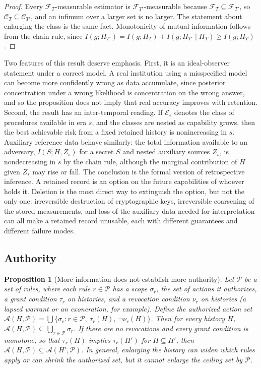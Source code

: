 \documentclass[11pt]{article}
\theoremstyle{plain}
\newtheorem{proposition}{Proposition}
\theoremstyle{definition}
\theoremstyle{remark}
\begin{document}
\begin{proof}
Every $\mathcal{F}_T$-measurable estimator is $\mathcal{F}_{T'}$-measurable because $\mathcal{F}_T\subseteq\mathcal{F}_{T'}$, so $\mathcal{C}_T\subseteq\mathcal{C}_{T'}$, and an infimum over a larger set is no larger. The statement about enlarging the class is the same fact. Monotonicity of mutual information follows from the chain rule, since $I(g;H_{T'})=I(g;H_T)+I(g;H_{T'}\mid H_T)\geq I(g;H_T)$.
\end{proof}

Two features of this result deserve emphasis. First, it is an ideal-observer statement under a correct model. A real institution using a misspecified model can become more confidently wrong as data accumulate, since posterior concentration under a wrong likelihood is concentration on the wrong answer, and so the proposition does not imply that real accuracy improves with retention. Second, the result has an inter-temporal reading. If $\mathcal{E}_s$ denotes the class of procedures available in era $s$, and the classes are nested as capability grows, then the best achievable risk from a fixed retained history is nonincreasing in $s$. Auxiliary reference data behave similarly: the total information available to an adversary, $I(S;H,Z_s)$ for a secret $S$ and nested auxiliary sources $Z_s$, is nondecreasing in $s$ by the chain rule, although the marginal contribution of $H$ given $Z_s$ may rise or fall. The conclusion is the formal version of retrospective inference. A retained record is an option on the future capabilities of whoever holds it. Deletion is the most direct way to extinguish the option, but not the only one: irreversible destruction of cryptographic keys, irreversible coarsening of the stored measurements, and loss of the auxiliary data needed for interpretation can all make a retained record unusable, each with different guarantees and different failure modes.

\subsection{Authority}

\begin{proposition}[More information does not establish more authority]\label{prop:authority}
Let $\mathcal{P}$ be a set of rules, where each rule $r\in\mathcal{P}$ has a scope $\sigma_r$, the set of actions it authorizes, a grant condition $\tau_r$ on histories, and a revocation condition $\nu_r$ on histories (a lapsed warrant or an exoneration, for example). Define the authorized action set $\mathcal{A}(H,\mathcal{P})=\bigcup\{\sigma_r: r\in\mathcal{P},\ \tau_r(H),\ \neg\nu_r(H)\}$. Then for every history $H$, $\mathcal{A}(H,\mathcal{P})\subseteq\bigcup_{r\in\mathcal{P}}\sigma_r$. If there are no revocations and every grant condition is monotone, so that $\tau_r(H)$ implies $\tau_r(H')$ for $H\subseteq H'$, then $\mathcal{A}(H,\mathcal{P})\subseteq\mathcal{A}(H',\mathcal{P})$. In general, enlarging the history can widen which rules apply or can shrink the authorized set, but it cannot enlarge the ceiling set by $\mathcal{P}$.
\end{proposition}
\end{document}
